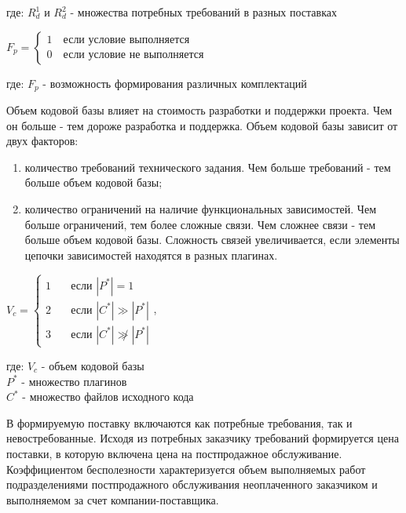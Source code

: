 \documentclass{article}
\begin{document}
\begin{enumerate}
        где: $R^1_{d}$ и $R^2_{d}$ - множества потребных требований в разных поставках

        \begin{center}
            $F_{p} = 
            \begin{cases}
                1 \quad \text{если условие выполняется}\\
                0 \quad \text{если условие не выполняется}
            \end{cases}
            $
        \end{center}

        где: $F_{p}$ - возможность формирования различных комплектаций 

        Объем кодовой базы влияет на стоимость разработки и поддержки проекта. Чем он больше - тем дороже разработка и поддержка. Объем кодовой базы зависит от двух факторов:
        \begin{enumerate}
            \item количество требований технического задания. Чем больше требований - тем больше объем кодовой базы;
            \item количество ограничений на наличие функциональных зависимостей. Чем больше ограничений, тем более сложные связи. Чем сложнее связи - тем больше объем кодовой базы. Сложность связей увеличивается, если элементы цепочки зависимостей находятся в разных плагинах.
        \end{enumerate}

        \begin{center}
            $V_{c} = 
            \begin{cases}
                1 & \quad \text{если } |P^*| = 1\\
                2 & \quad \text{если } |C^*| \gg |P^*|\\
                3 & \quad \text{если } |C^*| \not \gg |P^*|
            \end{cases}
            $,
        \end{center}

        где: $V_{c}$ - объем кодовой базы\\
        $P^*$ - множество плагинов\\
        $C^*$ - множество файлов исходного кода

        В формируемую поставку включаются как потребные требования, так и невостребованные. Исходя из потребных заказчику требований формируется цена поставки, в которую включена цена на постпродажное обслуживание. Коэффициентом бесполезности характеризуется объем выполняемых работ подразделениями постпродажного обслуживания неоплаченного заказчиком и выполняемом за счет компании-поставщика.


\end{enumerate}
\end{document}
